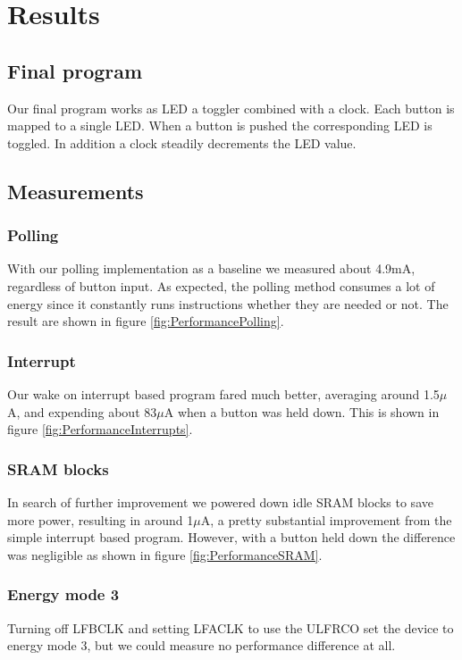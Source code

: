 \chapter{Results}

\section{Final program}
Our final program works as LED a toggler combined with a clock. Each button is mapped to a single LED. When a button is pushed the corresponding LED is toggled. In addition a clock steadily decrements the LED value.

\section{Measurements}

\subsection{Polling}
With our polling implementation as a baseline we measured about 4.9mA, regardless of button input. As expected, the polling method consumes a lot of energy since it constantly runs instructions whether they are needed or not. The result are shown in figure \ref{fig:PerformancePolling}.

\subsection{Interrupt}
Our wake on interrupt based program fared much better, averaging around 1.5$\mu$A, and expending about 83$\mu$A when a button was held down. This is shown in figure \ref{fig:PerformanceInterrupts}.

\subsection{SRAM blocks}
In search of further improvement we powered down idle SRAM blocks to save more power, resulting in around 1$\mu$A, a pretty substantial improvement from the simple interrupt based program. However, with a button held down the difference was negligible as shown in figure \ref{fig:PerformanceSRAM}.

\subsection{Energy mode 3}
Turning off LFBCLK and setting LFACLK to use the ULFRCO set the device to energy mode 3, but we could measure no performance difference at all.

